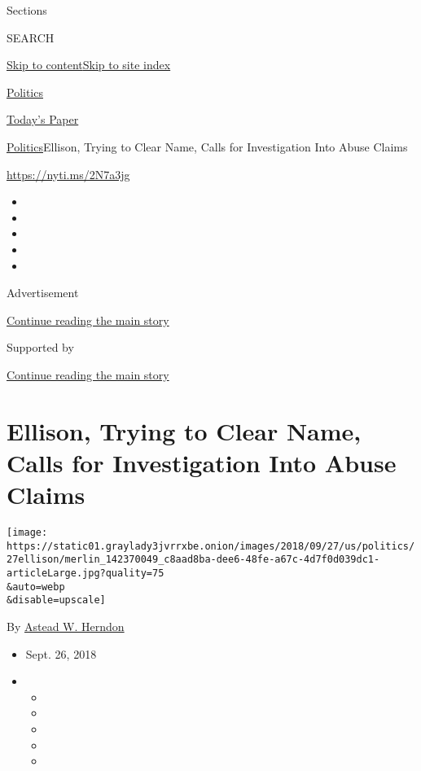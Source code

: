 Sections

SEARCH

\protect\hyperlink{site-content}{Skip to
content}\protect\hyperlink{site-index}{Skip to site index}

\href{https://www.nytimes3xbfgragh.onion/section/politics}{Politics}

\href{https://myaccount.nytimes3xbfgragh.onion/auth/login?response_type=cookie\&client_id=vi}{}

\href{https://www.nytimes3xbfgragh.onion/section/todayspaper}{Today's
Paper}

\href{/section/politics}{Politics}\textbar{}Ellison, Trying to Clear
Name, Calls for Investigation Into Abuse Claims

\url{https://nyti.ms/2N7a3jg}

\begin{itemize}
\item
\item
\item
\item
\item
\end{itemize}

Advertisement

\protect\hyperlink{after-top}{Continue reading the main story}

Supported by

\protect\hyperlink{after-sponsor}{Continue reading the main story}

\hypertarget{ellison-trying-to-clear-name-calls-for-investigation-into-abuse-claims}{%
\section{Ellison, Trying to Clear Name, Calls for Investigation Into
Abuse
Claims}\label{ellison-trying-to-clear-name-calls-for-investigation-into-abuse-claims}}

\texttt{[image: https://static01.graylady3jvrrxbe.onion/images/2018/09/27/us/politics/27ellison/merlin\_142370049\_c8aad8ba-dee6-48fe-a67c-4d7f0d039dc1-articleLarge.jpg?quality=75\\\&auto=webp\\\&disable=upscale]}

By \href{https://www.nytimes3xbfgragh.onion/by/astead-w-herndon}{Astead
W. Herndon}

\begin{itemize}
\item
  Sept. 26, 2018
\item
  \begin{itemize}
  \item
  \item
  \item
  \item
  \item
  \end{itemize}
\end{itemize}

